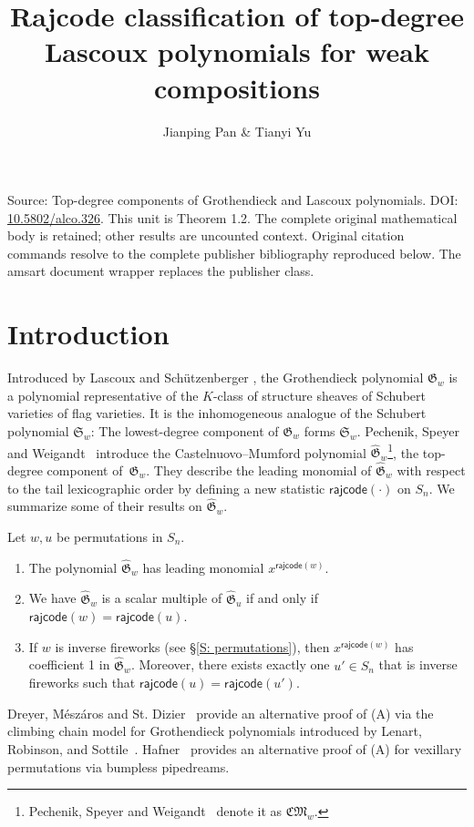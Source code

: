 \documentclass[10pt]{amsart}
\title[Human proof corpus 826]{Rajcode classification of top-degree Lascoux polynomials for weak compositions}
\author{Jianping Pan \& Tianyi Yu}
\theoremstyle{plain}
\theoremstyle{plain}
\theoremstyle{definition}
\theoremstyle{definition}
\theoremstyle{definition}
\theoremstyle{plain}
\theoremstyle{plain}
\theoremstyle{plain}
\theoremstyle{plain}
\theoremstyle{plain}
\theoremstyle{remark}
\theoremstyle{remark}
\theoremstyle{plain}
\theoremstyle{plain}
\newcommand{\fG}{\mathfrak{G}}
\newcommand{\fGb}{\fG}
\newcommand{\topGro}{\widehat{\fG}}
\newcommand{\fS}{\mathfrak{S}}
\newcommand{\rajcode}{\mathsf{rajcode}}
\begin{document}
\maketitle
\noindent Source: Top-degree components of Grothendieck and Lascoux polynomials. DOI: \href{https://doi.org/10.5802/alco.326}{10.5802/alco.326}. This unit is Theorem 1.2. The complete original mathematical body is retained; other results are uncounted context. Original citation commands resolve to the complete publisher bibliography reproduced below. The amsart document wrapper replaces the publisher class.


\section{Introduction}\label{S: Intro}

Introduced by Lascoux and Sch\"utzenberger \cite{LS:Groth},
the Grothendieck polynomial $\fGb_w$
is a polynomial representative of the 
$K$-class of structure sheaves of 
Schubert varieties of flag varieties.
It is the inhomogeneous analogue
of the Schubert polynomial $\fS_w$: 
The lowest-degree component
of $\fG_w$ forms $\fS_w$.
Pechenik, Speyer and Weigandt~\cite{PSW} introduce the
Castelnuovo--Mumford polynomial $\topGro_w$\footnote{Pechenik, Speyer and Weigandt~\cite{PSW} denote it as $\mathfrak{CM}_w$.}, 
the top-degree component of~$\fG_w$.
They describe the leading monomial of $\topGro_w$
with respect to the tail lexicographic order
by defining a new statistic 
$\rajcode(\cdot)$ on $S_n$.
We summarize some of their results on $\topGro_w$.

\begin{ourthm}
\label{thm:psw}
Let $w,u$ be permutations in $S_n$.
\begin{enumerate}
\item[(A)]
The polynomial $\topGro_w$ has leading monomial $x^{\rajcode(w)}$.
\item[(B)] 
We have
$\topGro_w$ is a scalar multiple of $\topGro_{u}$
if and only if $\rajcode(w) = \rajcode(u)$.
\item[(C)] 
If $w$ is inverse fireworks 
(see \S\ref{S: permutations}), 
then $x^{\rajcode(w)}$ has 
coefficient 1 in $\topGro_w$.
Moreover, there exists
exactly one $u'\in S_n$ that is inverse fireworks
such that $\rajcode(u) = \rajcode(u')$.
\end{enumerate}
\end{ourthm}

Dreyer, M\'esz\'aros and St. Dizier~\cite{dms22}
provide an alternative proof of (A) via the 
climbing chain model for Grothendieck polynomials
introduced by Lenart, Robinson, and Sottile~\cite{LRS}.
Hafner~\cite{Haf} provides an alternative proof of (A)
for vexillary permutations via bumpless pipedreams.
\end{document}
